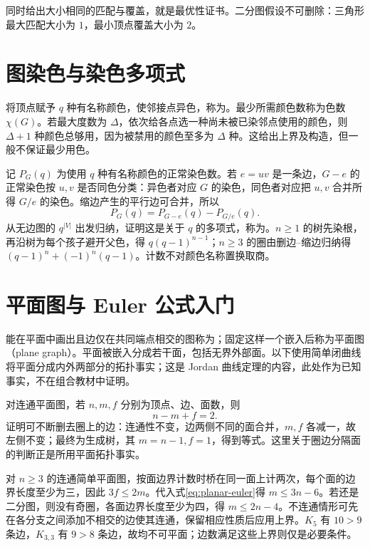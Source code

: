 \documentclass[UTF8,12pt,a4paper,fontset=fandol]{ctexbook}
\begin{document}
同时给出大小相同的匹配与覆盖，就是最优性证书。二分图假设不可删除：三角形最大匹配大小为 $1$，最小顶点覆盖大小为 $2$。

\section{图染色与染色多项式}

将顶点赋予 $q$ 种有名称颜色，使邻接点异色，称为。最少所需颜色数称为色数 $\chi(G)$。若最大度数为 $\Delta$，依次给各点选一种尚未被已染邻点使用的颜色，则 $\Delta+1$ 种颜色总够用，因为被禁用的颜色至多为 $\Delta$ 种。这给出上界及构造，但一般不保证最少用色。

记 $P_G(q)$ 为使用 $q$ 种有名称颜色的正常染色数。若 $e=uv$ 是一条边，$G-e$ 的正常染色按 $u,v$ 是否同色分类：异色者对应 $G$ 的染色，同色者对应把 $u,v$ 合并所得 $G/e$ 的染色。缩边产生的平行边可合并，所以
\[
 P_G(q)=P_{G-e}(q)-P_{G/e}(q).
\]
从无边图的 $q^{|V|}$ 出发归纳，证明这是关于 $q$ 的多项式，称为。$n\ge1$ 的树先染根，再沿树为每个孩子避开父色，得 $q(q-1)^{n-1}$；$n\ge3$ 的圈由删边--缩边归纳得 $(q-1)^n+(-1)^n(q-1)$。计数不对颜色名称置换取商。

\section{平面图与 Euler 公式入门}

能在平面中画出且边仅在共同端点相交的图称为；固定这样一个嵌入后称为平面图（plane graph）。平面被嵌入分成若干面，包括无界外部面。以下使用简单闭曲线将平面分成内外两部分的拓扑事实；这是 Jordan 曲线定理的内容，此处作为已知事实，不在组合教材中证明。

对连通平面图，若 $n,m,f$ 分别为顶点、边、面数，则
\begin{equation}
 n-m+f=2.
 \label{eq:planar-euler}
\end{equation}
证明可不断删去圈上的边：连通性不变，边两侧不同的面合并，$m,f$ 各减一，故左侧不变；最终为生成树，其 $m=n-1,f=1$，得到等式。这里关于圈边分隔面的判断正是所用平面拓扑事实。

对 $n\ge3$ 的连通简单平面图，按面边界计数时桥在同一面上计两次，每个面的边界长度至少为三，因此 $3f\le2m$。代入式\eqref{eq:planar-euler}得 $m\le3n-6$。若还是二分图，则没有奇圈，各面边界长度至少为四，得 $m\le2n-4$。不连通情形可先在各分支之间添加不相交的边使其连通，保留相应性质后应用上界。$K_5$ 有 $10>9$ 条边，$K_{3,3}$ 有 $9>8$ 条边，故均不可平面；边数满足这些上界则仅是必要条件。
\end{document}
